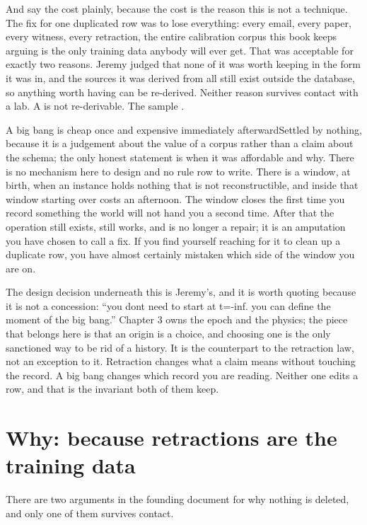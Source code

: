 And say the cost plainly, because the cost is the reason this is not a technique. The fix for one duplicated row was to lose everything: every email, every paper, every witness, every retraction, the entire calibration corpus this book keeps arguing is the only training data anybody will ever get. That was acceptable for exactly two reasons. Jeremy judged that none of it was worth keeping in the form it was in, and the sources it was derived from all still exist outside the database, so anything worth having can be re-derived. Neither reason survives contact with a lab. A \labRun{} is not re-derivable. The sample \labSampleLoss{}.

\begin{Open}{A big bang is cheap once and expensive immediately afterward}{Settled by nothing, because it is a judgement about the value of a corpus rather than a claim about the schema; the only honest statement is when it was affordable and why.}
There is no mechanism here to design and no rule row to write. There is a window, at birth, when an instance holds nothing that is not reconstructible, and inside that window starting over costs an afternoon. The window closes the first time you record something the world will not hand you a second time. After that the operation still exists, still works, and is no longer a repair; it is an amputation you have chosen to call a fix. If you find yourself reaching for it to clean up a duplicate row, you have almost certainly mistaken which side of the window you are on.
\end{Open}

The design decision underneath this is Jeremy's, and it is worth quoting because it is not a concession: ``you dont need to start at t=-inf. you can define the moment of the big bang.'' Chapter 3 owns the epoch and the physics; the piece that belongs here is that an origin is a choice, and choosing one is the only sanctioned way to be rid of a history. It is the counterpart to the retraction law, not an exception to it. Retraction changes what a claim means without touching the record. A big bang changes which record you are reading. Neither one edits a row, and that is the invariant both of them keep.

\section{Why: because retractions are the training data}

There are two arguments in the founding document for why nothing is deleted, and only one of them survives contact.

